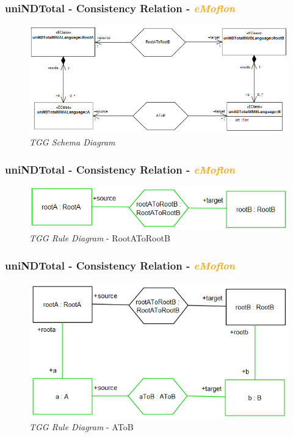 \documentclass{beamer}
\begin{document}
\begin{frame}
\frametitle{uniNDTotal - \textbf{Consistency Relation} - \textbf{\textit{\textcolor{orange}{eMoflon}}}}

\begin{figure}[ht]
  \centering 
  \includegraphics[scale=0.35]{printscreens/ea-MMAToMMBatt.png}
  \caption{\textit{TGG Schema Diagram}}
  \label{fig:ea-MMAToMMB}
\end{figure}

\end{frame}

\begin{frame}
\frametitle{uniNDTotal - \textbf{Consistency Relation} - \textbf{\textit{\textcolor{orange}{eMoflon}}}}

\begin{figure}[ht]
  \centering 
  \includegraphics[scale=0.5]{printscreens/ea-RootAToRootB-rule.png}
  \caption{\textit{TGG Rule Diagram} - RootAToRootB}
  \label{fig:ea-RootAToRootB-rule}
\end{figure}

\end{frame}

\begin{frame}
\frametitle{uniNDTotal - \textbf{Consistency Relation} - \textbf{\textit{\textcolor{orange}{eMoflon}}}}

\begin{figure}[ht]
  \centering 
  \includegraphics[scale=0.5]{printscreens/ea-AToB-rule.png}
  \caption{\textit{TGG Rule Diagram} - AToB}
  \label{fig:ea-AToB-rule}
\end{figure}

\end{frame}
\end{document}
